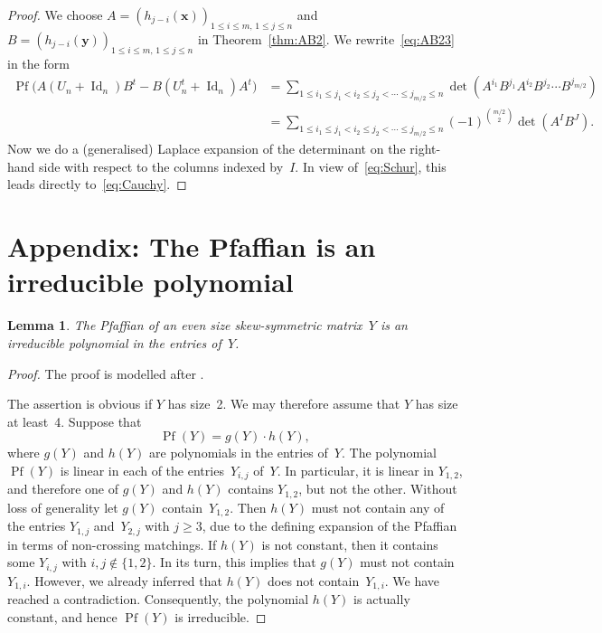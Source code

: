 \documentclass[12pt,reqno]{amsart}
\numberwithin{equation}{section}
\newtheorem{lemma}[theorem]{Lemma}
\theoremstyle{definition}
\theoremstyle{remark}
\def\Pf{\operatorname{Pf}}
\def\Id{\operatorname{Id}}
\begin{document}
\begin{proof}
We choose $A=(h_{j-i}(\mathbf x))_{1\le i\le m,\,1\le j\le n}$
and $B=(h_{j-i}(\mathbf y))_{1\le i\le m,\,1\le j\le n}$ in
Theorem~\ref{thm:AB2}. We rewrite~\eqref{eq:AB23} in the form
\begin{align*}
\Pf\bigl(A(U_n+\Id_n)B^t-B(U_n^t+\Id_n)A^t\bigr)&=
\sum_{1\le i_1\le j_1<i_2\le j_2<\cdots\le j_{m/2}\le n}
\det(A^{i_1}B^{j_1}A^{i_2}B^{j_2}\cdots B^{j_{m/2}})\\
&=\sum_{1\le i_1\le j_1<i_2\le j_2<\cdots\le j_{m/2}\le n}
(-1)^{\binom {m/2}2}\det(A^IB^J).
\end{align*}
Now we do a (generalised)
Laplace expansion of the determinant on the right-hand
side with respect to the columns indexed by~$I$. In view of~\eqref{eq:Schur},
this leads  directly to~\eqref{eq:Cauchy}.
\end{proof}




\section*{Appendix: The Pfaffian is an irreducible polynomial}

\setcounter{equation}{0}%
\global\def\thetheorem{\mbox{A}}
\global\def\theequation{\mbox{A.\arabic{equation}}}

\begin{lemma} \label{lem:3}
The Pfaffian of an even size skew-symmetric matrix~$Y$ is an irreducible
polynomial in the entries of\/~$Y$.
\end{lemma}

\begin{proof}
The proof is modelled after \cite[proof of Theorem~1,
pp.~176/177]{BochAA}.

The assertion is obvious if $Y$ has size~2. We may therefore assume
that $Y$ has size at least~4.
Suppose that
$$
\Pf(Y)=g(Y)\cdot h(Y),
$$
where $g(Y)$ and $h(Y)$ are polynomials in the entries of~$Y$.
The polynomial $\Pf(Y)$ is linear in each of the entries~$Y_{i,j}$
of~$Y$. In particular, it is linear in $Y_{1,2}$, and therefore
one of $g(Y)$ and $h(Y)$ contains $Y_{1,2}$, but not the
other. Without loss of generality let $g(Y)$ contain~$Y_{1,2}$.
Then $h(Y)$ must not contain any of the entries $Y_{1,j}$
and~$Y_{2,j}$ with $j\ge3$, due to the defining expansion of the
Pfaffian in terms of non-crossing matchings. If $h(Y)$ is not constant,
then it contains some $Y_{i,j}$ with $i,j\notin\{1,2\}$. In its turn,
this implies that $g(Y)$ must not contain~$Y_{1,i}$. However, we
already inferred that $h(Y)$ does not contain~$Y_{1,i}$. We have
reached a contradiction. Consequently, the polynomial $h(Y)$ is
actually constant, and hence $\Pf(Y)$ is irreducible.
\end{proof}
\end{document}
